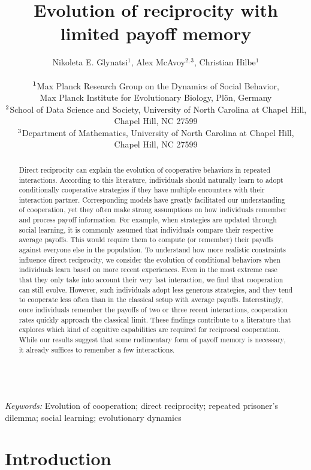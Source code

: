 \documentclass[11pt]{article}
\title{\bf  \sffamily \Large Evolution of reciprocity %
with limited payoff memory\\}
\date{}
\author{\parbox[c]{16cm}{\centering \onehalfspacing 
Nikoleta E. Glynatsi$^1$,  Alex McAvoy$^{2,3}$, Christian Hilbe$^1$\\ \quad \\
$^{\rm 1}$Max Planck Research Group on the Dynamics of Social Behavior,\\ Max Planck Institute for Evolutionary Biology, Pl\"{o}n, Germany \\
$^{\rm 2}$School of Data Science and Society, University of North Carolina at Chapel Hill,\\ Chapel Hill, NC 27599 \\
$^{\rm 3}$Department of Mathematics, University of North Carolina at Chapel Hill,\\ Chapel Hill, NC 27599}}
\theoremstyle{plainCl1}
\theoremstyle{plainCl2}
\begin{document}
\maketitle


\begin{abstract}
\noindent
Direct reciprocity can explain the evolution of cooperative behaviors in repeated interactions. 
According to this literature, individuals should naturally learn to adopt conditionally cooperative strategies if they have multiple encounters with their interaction partner. 
Corresponding models have greatly facilitated our understanding of cooperation, yet they often make strong assumptions on how individuals remember and process payoff information. 
For example, when strategies are updated through social learning, it is commonly assumed that individuals compare their respective average payoffs.  
This would require them to compute (or remember) their payoffs against everyone else in the population.
To understand how more realistic constraints influence direct reciprocity, we consider the evolution of conditional behaviors when individuals learn based on more recent experiences.
Even in the most extreme case that they only take into account their very last interaction, we find that cooperation can still evolve. 
However, such individuals adopt less generous strategies, and they tend to cooperate less often than in the classical setup with average payoffs. 
Interestingly, once individuals remember the payoffs of two or three recent interactions, cooperation rates quickly approach the classical limit. 
These findings contribute to a literature that explores which kind of cognitive capabilities are required for reciprocal cooperation. 
While our results suggest that some rudimentary form of payoff memory is necessary, it already suffices to remember a few interactions.
\end{abstract}

~\\
{\it Keywords:} Evolution of cooperation; direct reciprocity; repeated prisoner's dilemma; social learning; evolutionary dynamics



\clearpage
\newpage



\section{Introduction}

\end{document}
